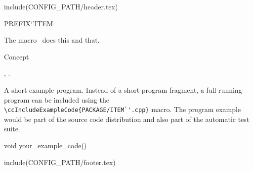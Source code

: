 include(CONFIG_PATH/header.tex)
\begin{ccRefMacro}{PREFIX`'ITEM}  %


\ccDefinition
  
The macro \ccRefName\ does this and that.



\ccIsModel

Concept

\ccSeeAlso

,
.

\ccExample

A short example program.
Instead of a short program fragment, a full running program can be
included using the 
\verb|\ccIncludeExampleCode{PACKAGE/ITEM`'.cpp}| 
macro. The program example would be part of the source code distribution and
also part of the automatic test suite.

\begin{ccExampleCode}
void your_example_code() {
}
\end{ccExampleCode}


\end{ccRefMacro}

include(CONFIG_PATH/footer.tex)
